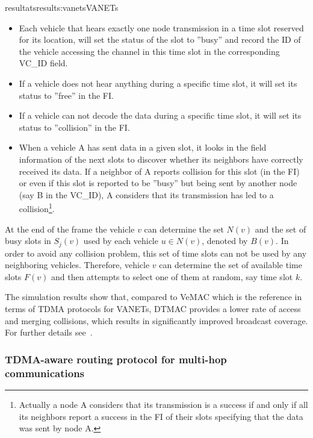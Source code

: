 \documentclass{ra2016}
\begin{document}
\begin{module}{resultats}{results:vanets}{VANETs}
\begin{itemize}

\item Each vehicle that hears exactly one node transmission in a time slot reserved for its location, will set the status 
of the slot to ''busy'' and record the ID of the vehicle accessing the channel in this time slot in the corresponding VC\_ID field.
\item If a vehicle does not hear anything during a specific time slot, it will set its status to ''free'' in the FI.
\item If a vehicle can not decode the data during a specific time slot, it will set its status to ''collision'' in the FI.
\item When a vehicle A has sent data in a given slot, it looks in the field information of the next slots to 
discover whether its neighbors 
have correctly received its data. If a neighbor of A reports  collision for this slot  (in the FI) or even if this slot is reported 
to be ''busy'' 
but being sent by another node (say B in the VC\_ID), A considers that its transmission has led to a 
collision\footnote{Actually a node A considers that its transmission is a success if and only if all its neighbors 
report a success in the FI of their slots specifying that the data was sent by node A.}. 
\end{itemize}

At the end of the frame the vehicle $v$ can determine the set $N(v)$ and the set of busy slots in $S_{j}(v)$ used by each 
vehicle $u\in N(v)$, denoted by $B(v)$. In order to avoid any collision problem, this set of time slots can not be used by 
any neighboring vehicles. Therefore,  vehicle $v$ can determine the set of available time slots $F(v)$ and then attempts to 
select one of them at random, say time slot $k$.

The simulation results show that, compared to VeMAC which is the reference in terms of TDMA protocols for VANETs, DTMAC provides a lower rate of access and merging collisions, which results in significantly improved broadcast coverage. For further details see~\cite{hadded:hal-01379216}. 



\subsubsection{TDMA-aware routing protocol for multi-hop communications}
 

\end{module}
\end{document}
